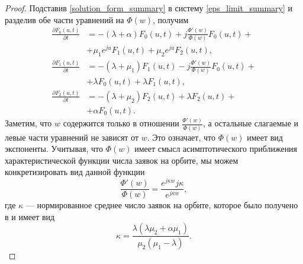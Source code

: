 \begin{proof}
	Подставив \eqref{solution_form_summary} в систему \eqref{eps_limit_summary} и разделив обе части уравнений на $\Phi(w)$, получим
	\begin{equation} \label{preresult_summary}
		\begin{split}
			\frac{{\partial F_{0}(u,t)}}{{\partial t}} &= -(\lambda + \alpha)F_{0}(u,t) + j
			\frac{\Phi'(w) }{\Phi(w)}F_{0}(u,t) +\\  &+ \mu_{1} e^{ju}F_{1}(u,t) + \mu_{2}e^{ju}F_{2}(u,t) ,
			\\
			\frac{{\partial F_{1}(u,t)}}{{\partial t}} &= -(\lambda + \mu_{1})F_{1}(u,t) - j 
			\frac{\Phi'(w) }{\Phi(w)}F_{0}(u,t) +\\  &+ \lambda F_{0}(u,t) + \lambda F_{1}(u,t) ,
			\\
			\frac{{\partial F_{2}(u,t)}}{{\partial t}} &= -(\lambda + \mu_{2})F_{2}(u,t)  + \lambda F_{2}(u,t) +\\  &+ \alpha F_{0}(u,t).
		\end{split}
	\end{equation}  
	Заметим, что $w$ содержится только в отношении $\frac{\Phi'(w) }{\Phi(w)}$, а остальные слагаемые и левые части уравнений не зависят от $w$. Это означает, что  $\Phi(w)$ имеет вид экспоненты. Учитывая, что  $\Phi(w)$ имеет смысл асимптотического приближения характеристической функции числа заявок на орбите, мы можем конкретизировать вид данной функции
	\begin{equation} \label{Phi_concrete}
		\frac{\Phi'(w) }{\Phi(w)} = \frac{e^{j\kappa w}j\kappa}{e^{j\kappa w}},
	\end{equation} 
	где $\kappa$ --- нормированное среднее число заявок на орбите, которое было получено в \cite{nazarov2017asymptotic} и имеет вид 
	\begin{equation*}
		\kappa = \frac{\lambda(\lambda \mu_{2} + \alpha \mu_{1})}{\mu_{2}(\mu_{1} - \lambda)}.
	\end{equation*}
	

\end{proof}

